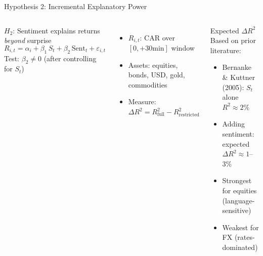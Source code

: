 \documentclass[aspectratio=169, 11pt]{beamer}
\begin{document}
\begin{frame}{Hypothesis 2: Incremental Explanatory Power}
  \begin{columns}[T]
    \begin{ablock}{$H_2$: Sentiment explains returns \emph{beyond} surprise}
      \begin{equation}
        R_{i,t} = \alpha_i + \beta_1\, S_t + \beta_2\, \mathrm{Sent}_t + \varepsilon_{i,t}
      \end{equation}
      Test: $\beta_2 \neq 0$ (after controlling for $S_t$)
    \end{ablock}

    \begin{itemize}
      \item<2-> $R_{i,t}$: CAR over $[0, +30\mathrm{min}]$ window
      \item<3-> Assets: equities, bonds, USD, gold, commodities
      \item<4-> Measure: $\Delta R^2 = R^2_{\mathrm{full}} - R^2_{\mathrm{restricted}}$
    \end{itemize}

    \begin{agreenblock}{Expected $\Delta R^2$}
      \footnotesize
      Based on prior literature:
      \begin{itemize}
        \item Bernanke \& Kuttner (2005): $S_t$ alone $R^2 \approx 2\%$
        \item Adding sentiment: expected $\Delta R^2 \approx 1$--$3\%$
        \item Strongest for equities (language-sensitive)
        \item Weakest for FX (rates-dominated)
      \end{itemize}
    \end{agreenblock}
  \end{columns}
\end{frame}
\end{document}

